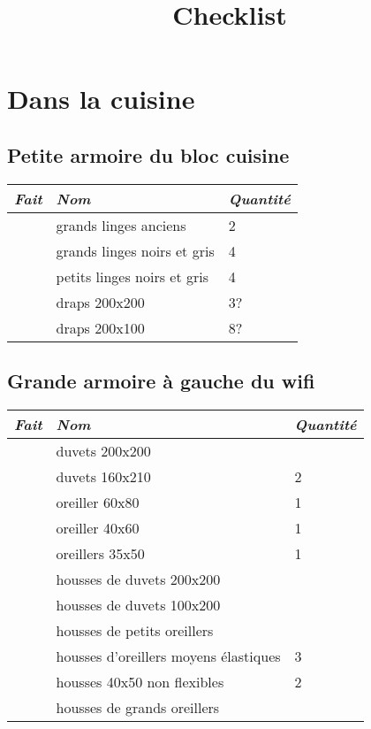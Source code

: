 \documentclass[french]{article}
\title{Checklist}
\begin{document}
\maketitle

\section{Dans la cuisine}

\subsection{Petite armoire du bloc cuisine}
\begin{tabular}{|l|l|l|}
	\hline
	\emph{Fait} & \emph{Nom} & \emph{Quantit\'e} \\
	\hline
		& grands linges	anciens & 2\\ \hline
		& grands linges noirs et gris & 4 \\ \hline
		& petits linges noirs et gris & 4 \\ \hline
		& draps 200x200               & 3? \\ \hline
		& draps 200x100               & 8? \\ \hline
	\hline
\end{tabular}

\subsection{Grande armoire à gauche du wifi}

\begin{tabular}{|l|l|l|}
	\hline
	\emph{Fait} & \emph{Nom} & \emph{Quantit\'e} \\
	\hline
	& duvets 200x200 & \\ \hline
	& duvets 160x210 &  2\\ \hline
	& oreiller  60x80 &  1 \\ \hline
	& oreiller  40x60 &  1 \\ \hline
	& oreillers 35x50 &  1 \\ \hline

	& housses de duvets 200x200 &  \\ \hline
	& housses de duvets 100x200 &  \\ \hline
	& housses de petits oreillers &  \\ \hline
	& housses d'oreillers moyens élastiques &  3 \\ \hline
	& housses 40x50 non flexibles & 2 \\ \hline
	& housses de grands oreillers &  \\ \hline
\end{tabular}
\end{document}

